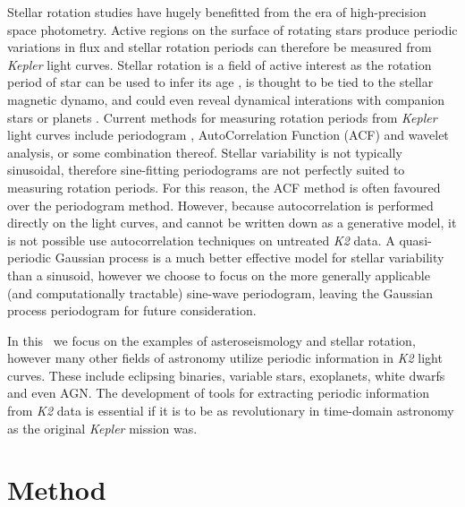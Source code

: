 \documentclass[useAMS, usenatbib, preprint, 12pt]{aastex}
\begin{document}
Stellar rotation studies have hugely benefitted from the era of high-precision
space photometry.
Active regions on the surface of rotating stars produce periodic variations
in flux and stellar rotation periods can therefore be measured from
{\it Kepler} light curves.
Stellar rotation is a field of active interest as the rotation period of star
can be used to infer its age \citep{Skumanich1972, Barnes2007, Epstein2014},
is thought to be tied to the stellar magnetic dynamo, and could even reveal
dynamical interations with companion stars or planets \citep[e.g.][]{Beky2014,
Poppenhaeger2014}.
Current methods for measuring rotation periods from {\it Kepler} light curves
include periodogram \citep[e.g.][]{Reinhold2013}, AutoCorrelation Function
(ACF) \citep{McQuillan2013} and wavelet \citep[e.g.][]{Garcia2014} analysis,
or some combination thereof.
Stellar variability is not typically sinusoidal, therefore sine-fitting
periodograms are not perfectly suited to measuring rotation periods.
For this reason, the ACF method is often favoured over the periodogram method.
However, because autocorrelation is performed directly on the light curves,
and cannot be written down as a generative model, it is not possible use
autocorrelation techniques on untreated {\it K2} data.
A quasi-periodic Gaussian process is a much better effective model for stellar
variability than a sinusoid, however we choose to focus on the more generally
applicable (and computationally tractable) sine-wave periodogram, leaving the
Gaussian process periodogram for future consideration.

In this \article\ we focus on the examples of asteroseismology and stellar
rotation, however many other fields of astronomy utilize periodic information
in {\it K2} light curves.
These include eclipsing binaries, variable stars, exoplanets, white dwarfs and
even AGN.
The development of tools for extracting periodic information from {\it K2}
data is essential if it is to be as revolutionary in time-domain
astronomy as the original {\it Kepler} mission was.

\section{Method}
\label{sec:Method}
\end{document}
